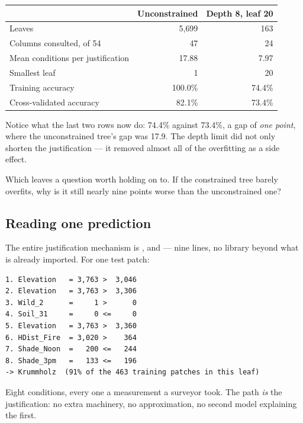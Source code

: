 \documentclass[11pt,a4paper]{article}
\begin{document}
\begin{center}
\small
\begin{tabular}{lrr}
\toprule
& \textbf{Unconstrained} & \textbf{Depth 8, leaf 20} \\
\midrule
Leaves & 5{,}699 & 163 \\
Columns consulted, of 54 & 47 & 24 \\
Mean conditions per justification & 17.88 & 7.97 \\
Smallest leaf & 1 & 20 \\
Training accuracy & 100.0\% & 74.4\% \\
Cross-validated accuracy & 82.1\% & 73.4\% \\
\bottomrule
\end{tabular}
\end{center}

Notice what the last two rows now do: 74.4\% against 73.4\%, a gap of \emph{one
point}, where the unconstrained tree's gap was 17.9. The depth limit did not
only shorten the justification --- it removed almost all of the overfitting as
a side effect.

Which leaves a question worth holding on to. If the constrained tree barely
overfits, why is it still nearly nine points worse than the unconstrained one?

\subsection{Reading one prediction}

The entire justification mechanism is ,
 and  --- nine lines, no library
beyond what is already imported. For one test patch:

\begin{center}
\small
\begin{verbatim}
1. Elevation   = 3,763 >  3,046
2. Elevation   = 3,763 >  3,306
3. Wild_2      =     1 >      0
4. Soil_31     =     0 <=     0
5. Elevation   = 3,763 >  3,360
6. HDist_Fire  = 3,020 >    364
7. Shade_Noon  =   200 <=   244
8. Shade_3pm   =   133 <=   196
-> Krummholz  (91% of the 463 training patches in this leaf)
\end{verbatim}
\end{center}

Eight conditions, every one a measurement a surveyor took. The path \emph{is}
the justification: no extra machinery, no approximation, no second model
explaining the first.
\end{document}

